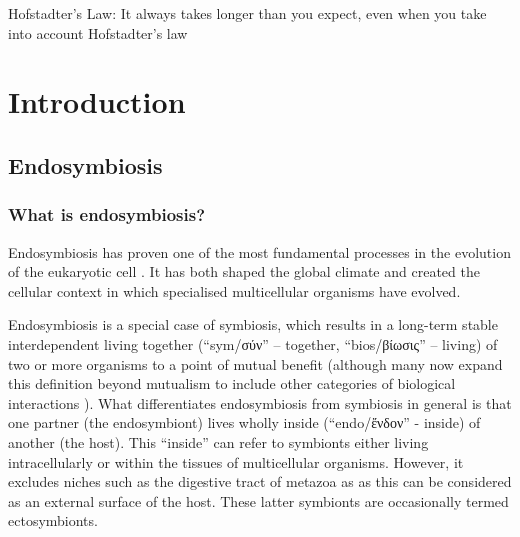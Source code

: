 \graphicspath{{chapters/1.Introduction/figures/}}

\begin{savequote}[75mm]
Hofstadter's Law: It always takes longer than you expect, even when you take into account Hofstadter's law
\end{savequote}

\chapter{Introduction}

\section{Endosymbiosis}

\subsection{What is endosymbiosis?}

Endosymbiosis has proven one of the most fundamental processes in the evolution of the
eukaryotic cell \citep{Timmis2004,Lane2007a,Martin1998b,Archibald2015}. It has both shaped the global climate and
created the cellular context in which specialised multicellular organisms have evolved.

Endosymbiosis is a special case of symbiosis, which results in a long-term stable interdependent 
living together (``sym/σύν'' -- together, ``bios/βίωσις'' -- living) of two or more 
organisms to a point of mutual benefit \citep{DeBary1869,Pound1893} (although many now expand 
this definition beyond mutualism to include other categories of biological interactions \citep{Leung2008,OMalley2015}).
What differentiates endosymbiosis from symbiosis in general is that one partner (the endosymbiont) lives wholly
inside (``endo/ἔνδον'' - inside) of another (the host). This ``inside'' can refer to symbionts either living intracellularly
or within the tissues of multicellular organisms.  However, it excludes niches such as the digestive tract of metazoa as 
as this can be considered as an external surface of the host. These latter symbionts are occasionally termed ectosymbionts.

